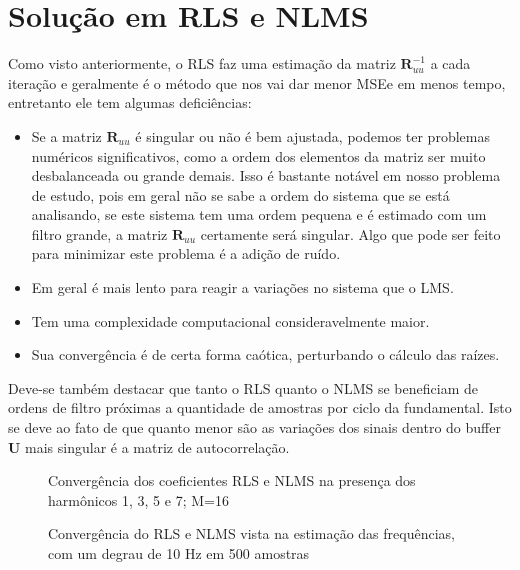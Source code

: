 \section{Solução em RLS e NLMS}

Como visto anteriormente, o RLS faz uma estimação da matriz $\boldsymbol{R}_{uu}^{-1}$ a cada iteração e geralmente é o método que nos vai dar menor MSEe em menos tempo, entretanto ele tem algumas deficiências:

\begin{itemize}
	\item Se a matriz $\boldsymbol{R}_{uu}$ é singular ou não é bem ajustada, podemos ter problemas numéricos significativos, como a ordem dos elementos da matriz ser muito desbalanceada ou grande demais. Isso é bastante notável em nosso problema de estudo, pois em geral não se sabe a ordem do sistema que se está analisando, se este sistema tem uma ordem pequena e é estimado com um filtro grande, a matriz $\boldsymbol{R}_{uu}$ certamente será singular. Algo que pode ser feito para minimizar este problema é a adição de ruído.
	\item Em geral é mais lento para reagir a variações no sistema que o LMS.
	\item Tem uma complexidade computacional consideravelmente maior.
	\item Sua convergência é de certa forma caótica, perturbando o cálculo das raízes.
\end{itemize}

Deve-se também destacar que tanto o RLS quanto o NLMS se beneficiam de ordens de filtro próximas a quantidade de amostras por ciclo da fundamental. Isto se deve ao fato de que quanto menor são as variações dos sinais dentro do buffer $\boldsymbol{U}$ mais singular é a matriz de autocorrelação. 

\begin{figure}[h]
	\centering    
	\def\svgwidth{\columnwidth}
	
	\caption{Convergência dos coeficientes RLS e NLMS na presença dos harmônicos 1, 3, 5 e 7; M=16}
	\label{fig:your image label}
\end{figure}

\begin{figure}[h]
	\centering    
	\def\svgwidth{\columnwidth}
	
	\caption{Convergência do RLS e NLMS vista na estimação das frequências, com um degrau de 10 Hz em 500 amostras}
	\label{fig:your image label}
\end{figure}

